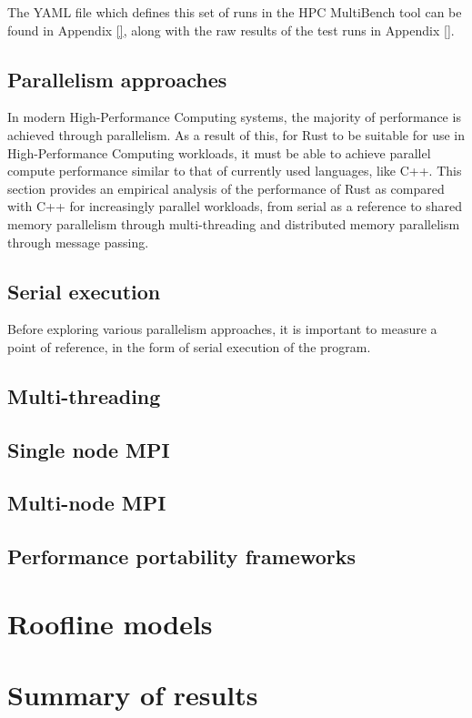 


The YAML file which defines this set of runs in the HPC MultiBench tool can be found in Appendix  \ref{}, along with the raw results of the test runs in Appendix \ref{}.

\subsection{Parallelism approaches}
\label{ssec:parallelism-approaches}

In modern High-Performance Computing systems, the majority of performance is achieved through parallelism. As a result of this, for Rust to be suitable for use in High-Performance Computing workloads, it must be able to achieve parallel compute performance similar to that of currently used languages, like C++. This section provides an empirical analysis of the performance of Rust as compared with C++ for increasingly parallel workloads, from serial as a reference to shared memory parallelism through multi-threading and distributed memory parallelism through message passing.

\subsection{Serial execution}
\label{ssec:multi-threaded}

Before exploring various parallelism approaches, it is important to measure a point of reference, in the form of serial execution of the program.

\subsection{Multi-threading}
\label{ssec:multi-threaded}

\subsection{Single node MPI}
\label{ssec:single-node-mpi}

\subsection{Multi-node MPI}
\label{ssec:multi-node-mpi}

\subsection{Performance portability frameworks}
\label{ssec:performance-portability-frameworks}



\section{Roofline models}
\label{sec:roofline-models}



\section{Summary of results}
\label{sec:performance-results}